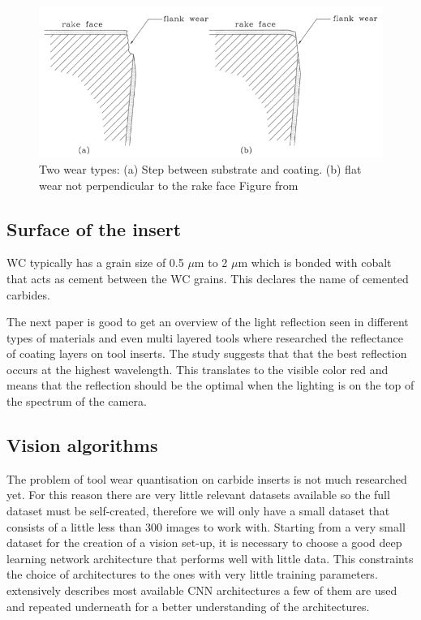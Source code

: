 	\begin{figure}[hbtp]
	\centering
	\includegraphics[scale=0.4]{fig/algemeen/plaatjes/Figuren/wear_types.png}
	\caption{Two wear types: (a) Step between substrate and coating. (b) flat wear not perpendicular to the rake face Figure from \citep{Gu1999}}
	\label{fig:gen:insertwears}
	\end{figure}

			
\subsection{Surface of the insert}
\label{sec:lit:surface}
	WC typically has a grain size of 0.5 $\mu$m to 2 $\mu$m which is bonded with cobalt that acts as cement between the WC grains. This declares the name of cemented carbides.
			
			
 The next paper is good to get an overview of the light reflection seen in different types of materials and even multi layered tools where
	\cite{Caicedo2019} researched the reflectance of coating layers on tool inserts. The study suggests that that the best reflection occurs at the highest wavelength. This translates to the visible color red and means that the reflection should be the optimal when the lighting is on the top of the spectrum of the camera. 

		
\subsection{Vision algorithms}
		The problem of tool wear quantisation on carbide inserts is not much researched yet. For this reason there are very little relevant datasets available so the full dataset must be self-created, therefore we will only have a small dataset that consists of a little less than 300 images to work with. Starting from a very small dataset for the creation of a vision set-up, it is necessary to choose a good deep learning network architecture that performs well with little data. This constraints the choice of architectures to the ones with very little training parameters. \cite{Khan2020} extensively describes most available CNN architectures a few of them are used and repeated underneath for a better understanding of the architectures.
		
